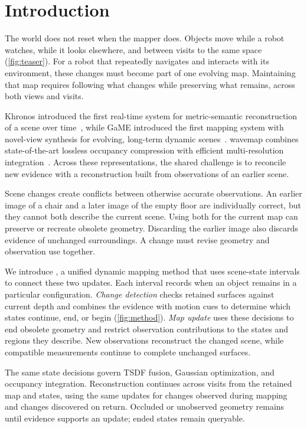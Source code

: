 \section{Introduction}
\label{sec:intro}

The world does not reset when the mapper does.
Objects move while a robot watches, while it looks elsewhere, and between visits to the same space
(\cref{fig:teaser}). For a robot that repeatedly navigates and interacts with its environment, these
changes must become part of one evolving map. Maintaining that map requires following what changes
while preserving what remains, across both views and visits.

Khronos introduced the first real-time system for metric-semantic reconstruction of a scene over time~\cite{schmid2024khronos},
while GaME introduced the first mapping system with novel-view synthesis for evolving, long-term dynamic
scenes~\cite{yugay2026game}. wavemap combines state-of-the-art lossless occupancy compression with
efficient multi-resolution integration~\cite{reijgwart2023wavemap}. Across these representations, the shared
challenge is to reconcile new evidence with a reconstruction built from observations of an earlier scene.

Scene changes create conflicts between otherwise accurate observations. An earlier image of a chair and
a later image of the empty floor are individually correct, but they cannot both describe the current
scene. Using both for the current map can preserve or recreate obsolete geometry. Discarding the earlier
image also discards evidence of unchanged surroundings. A change must revise geometry and observation use together.

We introduce \ours, a unified dynamic mapping method that uses scene-state intervals to connect these
two updates. Each interval records when an object remains in a particular configuration.
\emph{Change detection} checks retained surfaces against current depth and combines the evidence with
motion cues to determine which states continue, end, or begin (\cref{fig:method}). \emph{Map update}
uses these decisions to end obsolete geometry and restrict observation contributions to the states and
regions they describe. New observations reconstruct the changed scene, while compatible measurements
continue to complete unchanged surfaces.

The same state decisions govern TSDF fusion, Gaussian optimization, and occupancy integration.
Reconstruction continues across visits from the retained map and states, using the same updates for
changes observed during mapping and changes discovered on return. Occluded or unobserved geometry remains
until evidence supports an update; ended states remain queryable.


